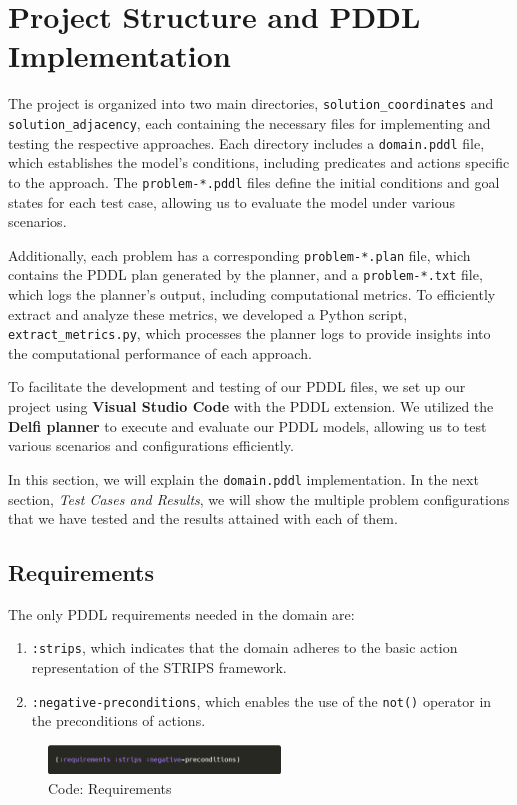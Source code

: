 \documentclass{article}
\begin{document}
\section{Project Structure and PDDL Implementation}

The project is organized into two main directories, \texttt{solution\_coordinates} and \texttt{solution\_adjacency}, each containing the necessary files for implementing and testing the respective approaches. Each directory includes a \texttt{domain.pddl} file, which establishes the model's conditions, including predicates and actions specific to the approach. The \texttt{problem-*.pddl} files define the initial conditions and goal states for each test case, allowing us to evaluate the model under various scenarios.

Additionally, each problem has a corresponding \texttt{problem-*.plan} file, which contains the PDDL plan generated by the planner, and a \texttt{problem-*.txt} file, which logs the planner's output, including computational metrics. To efficiently extract and analyze these metrics, we developed a Python script, \texttt{extract\_metrics.py}, which processes the planner logs to provide insights into the computational performance of each approach.

To facilitate the development and testing of our PDDL files, we set up our project using \textbf{Visual Studio Code} with the PDDL extension. We utilized the \textbf{Delfi planner} to execute and evaluate our PDDL models, allowing us to test various scenarios and configurations efficiently.

In this section, we will explain the \texttt{domain.pddl} implementation. In the next section, \textit{Test Cases and Results}, we will show the multiple problem configurations that we have tested and the results attained with each of them.

\subsection{Requirements}
The only PDDL requirements needed in the domain are:
\begin{enumerate}
    \item \texttt{:strips}, which indicates that the domain adheres to the basic action representation of the STRIPS framework.
    \item \texttt{:negative-preconditions}, which enables the use of the \texttt{not()} operator in the preconditions of actions.
\end{enumerate}
\begin{figure}[ht]
    \centering
    \includegraphics[width=0.55\textwidth]{assets/solution_coordinates/requirements.png}
    \caption{Code: Requirements}
    \label{fig:req}
\end{figure}
\end{document}
